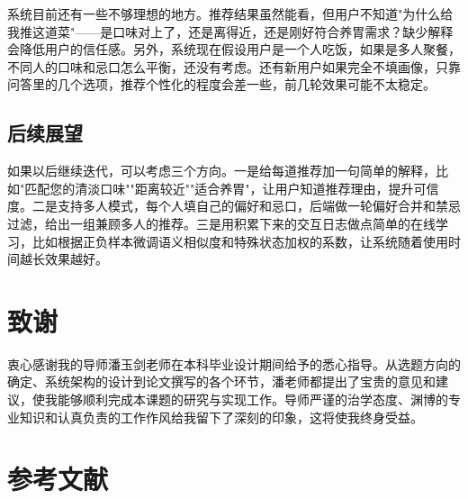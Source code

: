 系统目前还有一些不够理想的地方。推荐结果虽然能看，但用户不知道"为什么给我推这道菜"——是口味对上了，还是离得近，还是刚好符合养胃需求？缺少解释会降低用户的信任感。另外，系统现在假设用户是一个人吃饭，如果是多人聚餐，不同人的口味和忌口怎么平衡，还没有考虑。还有新用户如果完全不填画像，只靠问答里的几个选项，推荐个性化的程度会差一些，前几轮效果可能不太稳定。

\section{后续展望}

如果以后继续迭代，可以考虑三个方向。一是给每道推荐加一句简单的解释，比如"匹配您的清淡口味""距离较近""适合养胃"，让用户知道推荐理由，提升可信度。二是支持多人模式，每个人填自己的偏好和忌口，后端做一轮偏好合并和禁忌过滤，给出一组兼顾多人的推荐。三是用积累下来的交互日志做点简单的在线学习，比如根据正负样本微调语义相似度和特殊状态加权的系数，让系统随着使用时间越长效果越好。

\clearpage
\chapter*{致\quad 谢}

衷心感谢我的导师潘玉剑老师在本科毕业设计期间给予的悉心指导。从选题方向的确定、系统架构的设计到论文撰写的各个环节，潘老师都提出了宝贵的意见和建议，使我能够顺利完成本课题的研究与实现工作。导师严谨的治学态度、渊博的专业知识和认真负责的工作作风给我留下了深刻的印象，这将使我终身受益。

\clearpage
\chapter*{参考文献}

